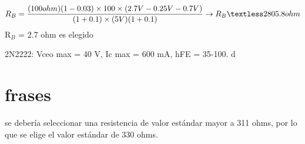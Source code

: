     \begin{equation}
        R_B 
        =   \frac { (100 ohm)(1-0.03) \times 100 \times ( 2.7V - 0.25V - 0.7V ) }   { (1 + 0.1)\times (5V)(1+0.1) }
        \rightarrow
        R_B \textless 2805.8 ohm
    \end{equation}
            R$_B$ = 2.7 ohm es elegido
    
    2N2222: Vceo max = 40 V, Ic max = 600 mA, hFE = 35-100.
    d
    
    \section{frases}
    se debería seleccionar una resistencia de valor estándar mayor a 311 ohms, por lo que se elige el valor estándar de 330 ohms.